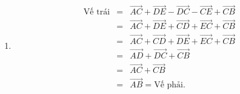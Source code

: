 \begin{bt}
{\begin{enumerate}
			\item \begin{eqnarray*}
				\text{Vế trái}
				&=&\overrightarrow{AC}+\overrightarrow{DE}-\overrightarrow{DC}-\overrightarrow{CE}+\overrightarrow{CB}\\
				&=&\overrightarrow{AC}+\overrightarrow{DE}+\overrightarrow{CD}+\overrightarrow{EC}+\overrightarrow{CB}\\
				&=&\overrightarrow{AC}+\overrightarrow{CD}+\overrightarrow{DE}+\overrightarrow{EC}+\overrightarrow{CB}\\
				&=&\overrightarrow{AD}+\overrightarrow{DC}+\overrightarrow{CB}\\
				&=&\overrightarrow{AC}+\overrightarrow{CB}\\
				&=&\overrightarrow{AB}=\text{Vế phải}.
			\end{eqnarray*}
		\end{enumerate}
	}
\end{bt}
